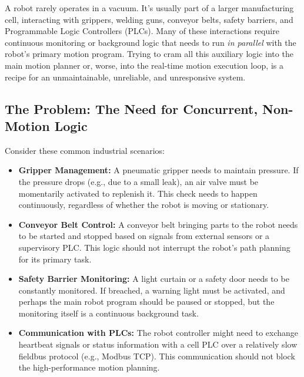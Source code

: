 A robot rarely operates in a vacuum. It's usually part of a larger manufacturing cell, interacting with grippers, welding guns, conveyor belts, safety barriers, and Programmable Logic Controllers (PLCs). Many of these interactions require continuous monitoring or background logic that needs to run \textit{in parallel} with the robot's primary motion program. Trying to cram all this auxiliary logic into the main motion planner or, worse, into the real-time motion execution loop, is a recipe for an unmaintainable, unreliable, and unresponsive system.

\subsection{The Problem: The Need for Concurrent, Non-Motion Logic}
\label{subsec:submitter_problem}

Consider these common industrial scenarios:
\begin{itemize}
    \item \textbf{Gripper Management:} A pneumatic gripper needs to maintain pressure. If the pressure drops (e.g., due to a small leak), an air valve must be momentarily activated to replenish it. This check needs to happen continuously, regardless of whether the robot is moving or stationary.
    \item \textbf{Conveyor Belt Control:} A conveyor belt bringing parts to the robot needs to be started and stopped based on signals from external sensors or a supervisory PLC. This logic should not interrupt the robot's path planning for its primary task.
    \item \textbf{Safety Barrier Monitoring:} A light curtain or a safety door needs to be constantly monitored. If breached, a warning light must be activated, and perhaps the main robot program should be paused or stopped, but the monitoring itself is a continuous background task.
    \item \textbf{Communication with PLCs:} The robot controller might need to exchange heartbeat signals or status information with a cell PLC over a relatively slow fieldbus protocol (e.g., Modbus TCP). This communication should not block the high-performance motion planning.
\end{itemize}

